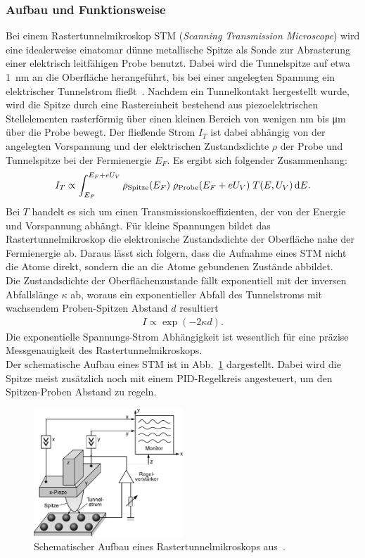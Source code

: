 \documentclass[a4paper,twoside,final]{article}
\begin{document}
\subsubsection{Aufbau und Funktionsweise}\label{sec:STM_Aufbau}
Bei einem Rastertunnelmikroskop STM (\textit{Scanning Transmission Microscope}) wird eine idealerweise einatomar dünne metallische Spitze als Sonde zur Abrasterung einer elektrisch leitfähigen Probe benutzt. Dabei wird die Tunnelspitze auf etwa \SI{1}{\nano\metre} an die Oberfläche herangeführt, bis bei einer angelegten Spannung ein elektrischer Tunnelstrom fließt~\cite{Versuchsanleitung}. Nachdem ein Tunnelkontakt hergestellt wurde, wird die Spitze durch eine Rastereinheit bestehend aus piezoelektrischen Stellelementen rasterförmig über einen kleinen Bereich von wenigen \si{\nano\metre} bis \si{\micro\metre} über die Probe bewegt. Der fließende Strom $I_T$ ist dabei abhängig von der angelegten Vorspannung und der elektrischen Zustandsdichte $\rho$ der Probe und Tunnelspitze bei der Fermienergie $E_F$. Es ergibt sich folgender Zusammenhang:
\begin{align}
  I_T \propto \int_{E_F}^{E_F+ eU_V} \rho_\text{Spitze}(E_F)\;\rho_\text{Probe}(E_F+eU_V) \;T(E,U_V)\,\mathrm{d} E.\label{eqn:Tunnelstrom}
\end{align}
Bei $T$ handelt es sich um einen Transmissionskoeffizienten, der von der Energie und Vorspannung abhängt. Für kleine Spannungen bildet das Rastertunnelmikroskop die elektronische Zustandsdichte der Oberfläche nahe der Fermienergie ab. Daraus lässt sich folgern, dass die Aufnahme eines STM nicht die Atome direkt, sondern die an die Atome gebundenen Zustände abbildet.\\
Die Zustandsdichte der Oberflächenzustande fällt exponentiell mit der inversen Abfallslänge $\kappa$ ab, woraus ein exponentieller Abfall des Tunnelstroms mit wachsendem Proben-Spitzen Abstand $d$ resultiert
\begin{align}
  I \propto \exp(-2\kappa d).
\end{align}
Die exponentielle Spannungs-Strom Abhängigkeit ist wesentlich für eine präzise Messgenauigkeit des Rastertunnelmikroskops.\\
Der schematische Aufbau eines STM ist in Abb.~\ref{fig:Rastertunnelmikroskop} dargestellt. Dabei wird die Spitze meist zusätzlich noch mit einem PID-Regelkreis angesteuert, um den Spitzen-Proben Abstand zu regeln.
\begin{figure}[htp]
    \centering
    \includegraphics[width=0.5\textwidth]{Bilder/Raster_Tunnelmikroskop.pdf}
    \caption{Schematischer Aufbau eines Rastertunnelmikroskops aus~\cite{Demtroeder}.}
    \label{fig:Rastertunnelmikroskop}
\end{figure}
\newpage
\end{document}

